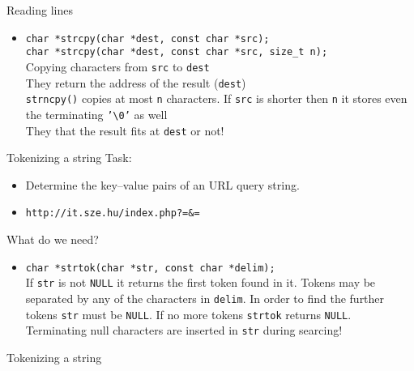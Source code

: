 \documentclass[usenames,dvipsnames,aspectratio=169]{beamer}
\begin{document}
\begin{frame}{Reading lines}
  \footnotesize
  \begin{itemize}
    \item \texttt{char *strcpy(char *dest, const char *src);} \\
      \texttt{char *strcpy(char *dest, const char *src, size\_t n);}\\
      Copying characters from \texttt{src} to \texttt{dest}\\
      They return the address of the result (\texttt{dest}) \\
      \texttt{strncpy()} copies at most \texttt{n} characters. If \texttt{src} is shorter then \texttt{n} it stores even the terminating \texttt{'\textbackslash 0'} as well \\
      They  that the result fits at \texttt{dest} or not!
  \end{itemize}
  \begin{exampleblock}{}
    
  \end{exampleblock}
\end{frame}

\begin{frame}[fragile]{Tokenizing a string}
  Task:
  \begin{itemize}
    \item Determine the key--value pairs of an URL query string.
    \item \texttt{http://it.sze.hu/index.php?=\&=}
  \end{itemize}
  What do we need?
  \begin{itemize}
    \item \texttt{char *strtok(char *str, const char *delim);} \\
      If \texttt{str} is not \texttt{NULL} it returns the first token found in it. Tokens may be separated by any of the characters in \texttt{delim}. In order to find the further tokens \texttt{str} must be \texttt{NULL}. If no more tokens \texttt{strtok} returns \texttt{NULL}. Terminating null characters are inserted in \texttt{str} during searcing!
  \end{itemize}
\end{frame}

\begin{frame}{Tokenizing a string}
  \scriptsize
  \begin{exampleblock}{}
    
  \end{exampleblock}
\end{frame}
\end{document}
